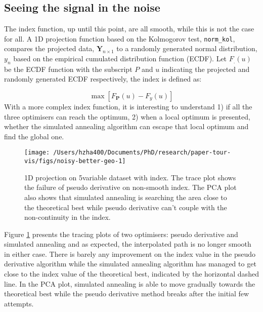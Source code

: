 \hypertarget{seeing-the-signal-in-the-noise}{%
\subsection{Seeing the signal in the
noise}\label{seeing-the-signal-in-the-noise}}

The index function, up until this point, are all smooth, while this is
not the case for all. A 1D projection function based on the Kolmogorov
test, \texttt{norm\_kol}, compares the projected data,
\(\mathbf{Y}_{n \times 1}\) to a randomly generated normal distribution,
\(y_n\) based on the empirical cumulated distribution function (ECDF).
Let \(F_{.}(u)\) be the ECDF function with the subscript \(P\) and \(u\)
indicating the projected and randomly generated ECDF respectively, the
index is defined as:

\[\max \left[F_{\mathbf{P}}(u) - F_{y}(u)\right]\] With a more complex
index function, it is interesting to understand 1) if all the three
optimisers can reach the optimum, 2) when a local optimum is presented,
whether the simulated annealing algorithm can escape that local optimum
and find the global one.

\begin{Schunk}
\begin{figure}

{\centering \texttt{[image: /Users/hzha400/Documents/PhD/research/paper-tour-vis/figs/noisy-better-geo-1]} 

}

\caption[1D projection on 5\-variable dataset  with  index]{1D projection on 5\-variable dataset  with  index. The trace plot shows the failure of pseudo derivative on non-smooth index. The PCA plot also shows that simulated annealing is searching the area close to the theoretical best while pseudo derivative can't couple with the non-continuity in the index.}\label{fig:noisy-better-geo}
\end{figure}
\end{Schunk}

Figure \ref{fig:noisy-better-geo} presents the tracing plots of two
optimisers: pseudo derivative and simulated annealing and as expected,
the interpolated path is no longer smooth in either case. There is
barely any improvement on the index value in the pseudo derivative
algorithm while the simulated annealing algorithm has managed to get
close to the index value of the theoretical best, indicated by the
horizontal dashed line. In the PCA plot, simulated annealing is able to
move gradually towards the theoretical best while the pseudo derivative
method breaks after the initial few attempts.

